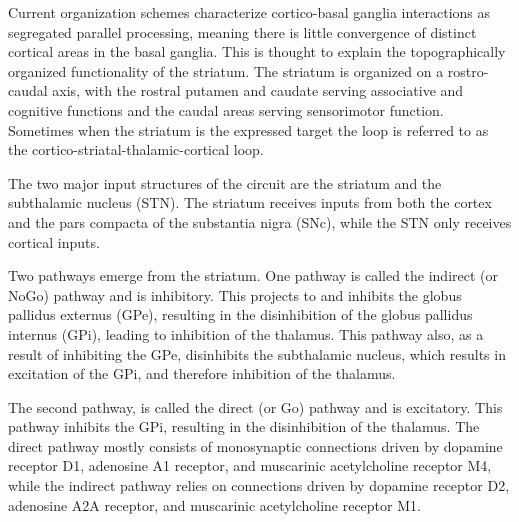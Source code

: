 Current organization schemes characterize cortico-basal ganglia interactions as segregated parallel processing, meaning there is little convergence of distinct cortical areas in the basal ganglia. This is thought to explain the topographically organized functionality of the striatum. The striatum is organized on a rostro-caudal axis, with the rostral putamen and caudate serving associative and cognitive functions and the caudal areas serving sensorimotor function. Sometimes when the striatum is the expressed target the loop is referred to as the cortico-striatal-thalamic-cortical loop.

The two major input structures of the circuit are the striatum and the subthalamic nucleus (STN). The striatum receives inputs from both the cortex and the pars compacta of the substantia nigra (SNc), while the STN only receives cortical inputs.

Two pathways emerge from the striatum. One pathway is called the indirect (or NoGo) pathway and is inhibitory. This projects to and inhibits the globus pallidus externus (GPe), resulting in the disinhibition of the globus pallidus internus (GPi), leading to inhibition of the thalamus. This pathway also, as a result of inhibiting the GPe, disinhibits the subthalamic nucleus, which results in excitation of the GPi, and therefore inhibition of the thalamus.

The second pathway, is called the direct (or Go) pathway and is excitatory. This pathway inhibits the GPi, resulting in the disinhibition of the thalamus. The direct pathway mostly consists of monosynaptic connections driven by dopamine receptor D1, adenosine A1 receptor, and muscarinic acetylcholine receptor M4, while the indirect pathway relies on connections driven by dopamine receptor D2, adenosine A2A receptor, and muscarinic acetylcholine receptor M1.



